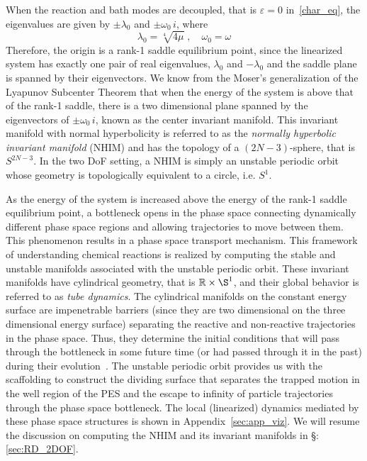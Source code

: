 \documentclass{ws-ijbc}
\begin{document}
When the reaction and bath modes are decoupled, that is $\varepsilon = 0$ in~\eqref{char_eq}, the eigenvalues are given by $\pm \lambda_0$ and $\pm \omega_0 \, i$, where 
\begin{equation}
\lambda_0 = \sqrt[4]{4\mu} \;,\quad \omega_0 = \omega
\end{equation}
Therefore, the origin is a rank-1 saddle equilibrium point, since the linearized system has exactly one pair of real eigenvalues, $\lambda_0$ and $-\lambda_0$ and the saddle plane is spanned by their eigenvectors. We know from the Moser's generalization of the Lyapunov Subcenter Theorem\cite{wiggins2013normally,wiggins2003applied} that when the energy of the system is above that of the rank-1 saddle, there is a two dimensional plane spanned by the eigenvectors of $\pm \omega_0 \, i$, known as the center invariant manifold. This invariant manifold with normal hyperbolicity is referred to as the \textit{normally hyperbolic invariant manifold} (NHIM) and has the topology of a $(2N-3)$-sphere, that is $S^{2N-3}$. In the two DoF setting, a NHIM is simply an unstable periodic orbit whose geometry is topologically equivalent to a circle, i.e. $S^1$. 

As the energy of the system is increased above the energy of the rank-1 saddle equilibrium point, a bottleneck opens in the phase space connecting dynamically different phase space regions and allowing trajectories to move between them. This phenomenon results in a phase space transport mechanism. This framework of understanding chemical reactions is realized by computing the stable and unstable manifolds associated with the unstable periodic orbit. These invariant manifolds have cylindrical geometry, that is $\mathbb{R} \times \S^1$, and their global behavior is referred to as \textit{tube dynamics}. The cylindrical manifolds on the constant energy surface are impenetrable barriers (since they are two dimensional on the three dimensional energy surface) separating the reactive and non-reactive trajectories in the phase space. Thus, they determine the initial conditions that will pass through the bottleneck in some future time (or had passed through it in the past) during their evolution~\cite{wiggins_impenetrable_2001}. The unstable periodic orbit provides us with the scaffolding to construct the dividing surface that separates the trapped motion in the well region of the PES and the escape to infinity of particle trajectories through the phase space bottleneck. The local (linearized) dynamics mediated by these phase space structures is shown in Appendix~\ref{sec:app_viz}. We will resume the discussion on computing the NHIM and its invariant manifolds in \S:\ref{sec:RD_2DOF}.
\end{document}
